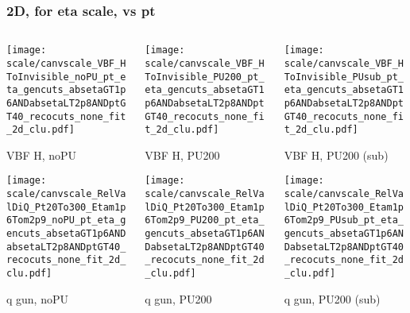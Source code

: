 \documentclass[8pt]{beamer}
\begin{document}
   \begin{frame}
  \frametitle{2D, for eta scale, vs pt}
  
  \begin{columns}
   \begin{column}{0.35\textwidth}
     \texttt{[image: scale/canvscale\_VBF\_HToInvisible\_noPU\_pt\_eta\_gencuts\_absetaGT1p6ANDabsetaLT2p8ANDptGT40\_recocuts\_none\_fit\_2d\_clu.pdf]}
     
     VBF H, noPU
    
     \texttt{[image: scale/canvscale\_RelValDiQ\_Pt20To300\_Etam1p6Tom2p9\_noPU\_pt\_eta\_gencuts\_absetaGT1p6ANDabsetaLT2p8ANDptGT40\_recocuts\_none\_fit\_2d\_clu.pdf]}
     
     q gun, noPU
   \end{column}
   \begin{column}{0.35\textwidth}
     \texttt{[image: scale/canvscale\_VBF\_HToInvisible\_PU200\_pt\_eta\_gencuts\_absetaGT1p6ANDabsetaLT2p8ANDptGT40\_recocuts\_none\_fit\_2d\_clu.pdf]}
     
     VBF H, PU200
    
     \texttt{[image: scale/canvscale\_RelValDiQ\_Pt20To300\_Etam1p6Tom2p9\_PU200\_pt\_eta\_gencuts\_absetaGT1p6ANDabsetaLT2p8ANDptGT40\_recocuts\_none\_fit\_2d\_clu.pdf]}
     
     q gun, PU200
   \end{column}
   \begin{column}{0.35\textwidth}
     \texttt{[image: scale/canvscale\_VBF\_HToInvisible\_PUsub\_pt\_eta\_gencuts\_absetaGT1p6ANDabsetaLT2p8ANDptGT40\_recocuts\_none\_fit\_2d\_clu.pdf]}
     
     VBF H, PU200 (sub)
    
     \texttt{[image: scale/canvscale\_RelValDiQ\_Pt20To300\_Etam1p6Tom2p9\_PUsub\_pt\_eta\_gencuts\_absetaGT1p6ANDabsetaLT2p8ANDptGT40\_recocuts\_none\_fit\_2d\_clu.pdf]}
     
     q gun, PU200 (sub)
   \end{column}
  \end{columns}
 \end{frame}
 
\end{document}
